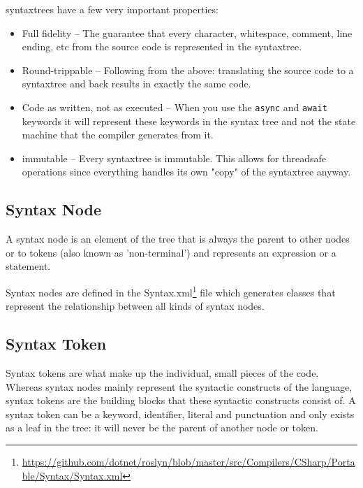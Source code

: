 \begin{minipage}{.95\linewidth}
\Glspl{syntaxtree} have a few very important properties:

\begin{itemize}
	\item Full fidelity -- The guarantee that every character, whitespace, comment, line ending, etc from the source code is represented in the \gls{syntaxtree}.
	\item Round-trippable -- Following from the above: translating the source code to a \gls{syntaxtree} and back results in exactly the same code.
	\item Code as written, not as executed -- When you use the \texttt{async} and \texttt{await} keywords it will represent these keywords in the syntax tree and not the state machine that the compiler generates from it.
	\item \gls{immutable} -- Every \gls{syntaxtree} is immutable. This allows for \gls{threadsafe} operations since everything handles its own "copy" of the \gls{syntaxtree} anyway.
\end{itemize}
\end{minipage}

\subsection{Syntax Node}
\label{sec:syntax-node}

A syntax node is an element of the tree that is always the parent to other nodes or to tokens (also known as 'non-terminal') and represents an expression or a statement. 

Syntax nodes are defined in the Syntax.xml\footnote{\url{https://github.com/dotnet/roslyn/blob/master/src/Compilers/CSharp/Portable/Syntax/Syntax.xml}} file which generates classes that represent the relationship between all kinds of syntax nodes. 

\subsection{Syntax Token}
\label{sec:syntax-token}

Syntax tokens are what make up the individual, small pieces of the code. Whereas syntax nodes mainly represent the syntactic constructs of the language, syntax tokens are the building blocks that these syntactic constructs consist of.
A syntax token can be a keyword, identifier, literal and punctuation and only exists as a leaf in the tree: it will never be the parent of another node or token.

